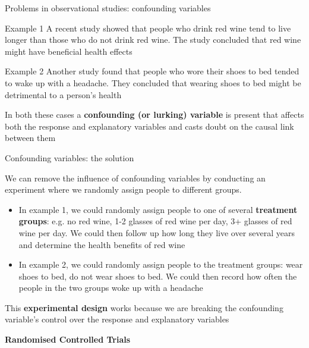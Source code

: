 \documentclass[12pt,xcolor=dvipsnames,handout,mathserif,aspectratio=169]{beamer}
\newcommand{\bbl}[1]{{\color{NavyBlue} \textbf{#1}}}
\newcommand{\bre}[1]{{\color{red} \textbf{#1}}}
\newcommand{\bgr}[1]{{\color{PineGreen} \textbf{#1}}}
\begin{document}
\begin{frame}{Problems in observational studies: confounding variables}

\begin{block}{Example 1}
A recent study showed that people who drink red wine tend to live longer than those who do not drink red wine. The study concluded that red wine might have beneficial health effects
\end{block}
\pause
\begin{block}{Example 2}
Another study found that people who wore their shoes to bed tended to wake up with a headache. They concluded that wearing shoes to bed might be detrimental to a person's health 
\end{block}
\pause
In both these cases a \bre{confounding (or lurking) variable} is present that affects both the response and explanatory variables and casts doubt on the causal link between them
\end{frame}

\begin{frame}{Confounding variables: the solution }

We can remove the influence of confounding variables by conducting an experiment where we randomly assign people to different groups.
\begin{itemize}
\item In example 1, we could randomly assign people to one of several \bgr{treatment groups}: e.g. no red wine, 1-2 glasses of red wine per day, 3+ glasses of red wine per day. We could then follow up how long they live over several years and determine the health benefits of red wine
\pause
\item In example 2, we could randomly assign people to the treatment groups: wear shoes to bed, do not wear shoes to bed. We could then record how often the people in the two groups woke up with a headache
\end{itemize}
\pause
This \bbl{experimental design} works because we are breaking the confounding variable's control over the response and explanatory variables

\end{frame}

\begin{frame}[fragile]{}
\bbl{\Huge Randomised Controlled Trials}\\ 
\vspace{0.5cm}
\end{frame}
\end{document}
